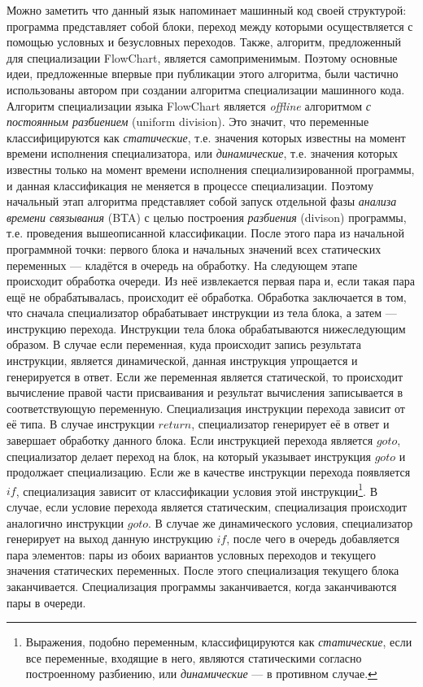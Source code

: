 Можно заметить что данный язык напоминает машинный код своей структурой: программа представляет собой блоки, переход между которыми
осуществляется с помощью условных и безусловных переходов.
Также, алгоритм, предложенный для специализации \textsf{FlowChart}, является самоприменимым.
Поэтому основные идеи, предложенные впервые при публикации этого алгоритма, были частично использованы автором при создании
алгоритма специализации машинного кода.
Алгоритм специализации языка \textsf{FlowChart} является \emph{offline} алгоритмом \emph{с постоянным разбиением} (uniform division).
Это значит, что переменные классифицируются как \emph{статические}, т.е. значения которых известны на момент времени исполнения
специализатора, или \emph{динамические}, т.е. значения которых известны только на момент времени исполнения специализированной программы,
и данная классификация не меняется в процессе специализации.
Поэтому начальный этап алгоритма представляет собой запуск отдельной фазы \emph{анализа времени связывания} (BTA) с целью построения
\emph{разбиения} (divison) программы, т.е. проведения вышеописанной классификации.
После этого пара из начальной программной точки: первого блока и начальных значений всех статических переменных ---
кладётся в очередь на обработку.
На следующем этапе происходит обработка очереди. Из неё извлекается первая пара и, если такая пара ещё не обрабатывалась, происходит её обработка. Обработка заключается в том, что сначала специализатор обрабатывает инструкции из тела блока, а затем --- инструкцию перехода. Инструкции тела блока обрабатываются нижеследующим образом. В случае если переменная, куда происходит запись результата инструкции, является динамической, данная инструкция упрощается и генерируется в ответ. Если же переменная является статической, то происходит вычисление правой части присваивания и результат вычисления записывается в соответствующую переменную. Специализация инструкции перехода зависит от её типа. В случае инструкции $return$, специализатор генерирует её в ответ и завершает обработку данного блока. Если инструкцией перехода является $goto$, специализатор делает переход на блок, на который указывает инструкция $goto$ и продолжает специализацию.
Если же в качестве инструкции перехода появляется $if$, специализация зависит от классификации условия этой
инструкции\footnote{Выражения, подобно переменным, классифицируются как \emph{статические}, если все переменные, входящие в него,
  являются статическими согласно построенному разбиению, или \emph{динамические} --- в противном случае.}.
В случае, если условие перехода является статическим, специализация происходит аналогично инструкции $goto$.
В случае же динамического условия, специализатор генерирует на выход данную инструкцию $if$,
после чего в очередь добавляется пара элементов: пары из обоих вариантов условных переходов и текущего значения статических переменных.
После этого специализация текущего блока заканчивается. Специализация программы заканчивается, когда заканчиваются пары в очереди. 

